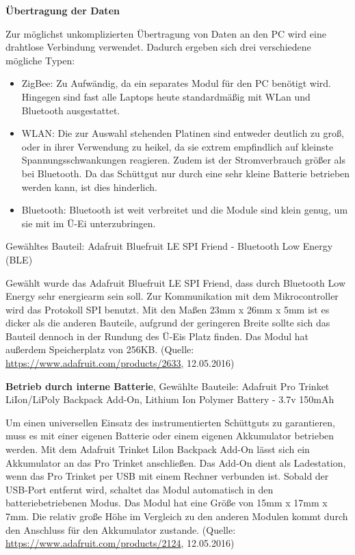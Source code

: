 {\textbf{Übertragung der Daten}

Zur möglichst unkomplizierten Übertragung von Daten an den PC wird eine drahtlose Verbindung verwendet. Dadurch ergeben sich drei verschiedene mögliche Typen:
\begin{itemize}
	\item ZigBee: Zu Aufwändig, da ein separates Modul für den PC benötigt wird. Hingegen sind fast alle Laptops heute standardmäßig mit WLan und Bluetooth ausgestattet.
	\item WLAN: Die zur Auswahl stehenden Platinen sind entweder deutlich zu groß, oder in ihrer Verwendung zu heikel, da sie extrem empfindlich auf kleinste Spannungsschwankungen reagieren. Zudem ist der Stromverbrauch größer als bei Bluetooth. Da das Schüttgut nur durch eine sehr kleine Batterie betrieben werden kann, ist dies hinderlich.
	\item Bluetooth: Bluetooth ist weit verbreitet und die Module sind klein genug, um sie mit im Ü-Ei unterzubringen.
\end{itemize}

Gewähltes Bauteil: Adafruit Bluefruit LE SPI Friend - Bluetooth Low Energy (BLE)

Gewählt wurde das Adafruit Bluefruit LE SPI Friend, dass durch Bluetooth Low Energy sehr energiearm sein soll. Zur Kommunikation mit dem Mikrocontroller wird das Protokoll SPI benutzt. Mit den Maßen 23mm x 26mm x 5mm ist es dicker als die anderen Bauteile, aufgrund der geringeren Breite sollte sich das Bauteil dennoch in der Rundung des Ü-Eis Platz finden. Das Modul hat außerdem Speicherplatz von 256KB. (Quelle: \url{https://www.adafruit.com/products/2633}, 12.05.2016)

\textbf{Betrieb durch interne Batterie}, Gewählte Bauteile: Adafruit Pro Trinket LiIon/LiPoly Backpack Add-On, Lithium Ion Polymer Battery - 3.7v 150mAh

Um einen universellen Einsatz des instrumentierten Schüttguts zu garantieren, muss es mit einer eigenen Batterie oder einem eigenen Akkumulator betrieben werden. 
Mit dem Adafruit Trinket Lilon Backpack Add-On lässt sich ein Akkumulator an das Pro Trinket anschließen. Das Add-On dient als Ladestation, wenn das Pro Trinket per USB mit einem Rechner verbunden ist. Sobald der USB-Port entfernt wird, schaltet das Modul automatisch in den batteriebetriebenen Modus. Das Modul hat eine Größe von 15mm x 17mm x 7mm. Die relativ große Höhe im Vergleich zu den anderen Modulen kommt durch den Anschluss für den Akkumulator zustande. (Quelle: \url{https://www.adafruit.com/products/2124}, 12.05.2016)

}
